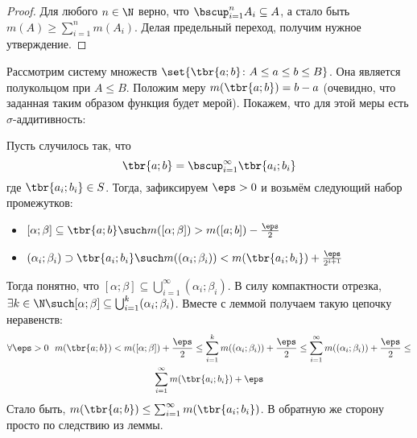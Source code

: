 \begin{proof}
	Для любого $n \in \N$ верно, что $\bscup_{i = 1}^n A_i \subseteq A$, а стало быть $m(A) \ge \sum_{i = 1}^n m(A_i)$. Делая предельный переход, получим нужное утверждение.
\end{proof}

\begin{example}
	Рассмотрим систему множеств $\set{\tbr{a; b} \colon A \le a \le b \le B}$. Она является полукольцом при $A \le B$. Положим меру $m(\tbr{a; b}) = b - a$ (очевидно, что заданная таким образом функция будет мерой). Покажем, что для этой меры есть $\sigma$-аддитивность:
	
	Пусть случилось так, что
	\[
		\tbr{a; b} = \bscup_{i = 1}^\infty \tbr{a_i; b_i}
	\]
	где $\tbr{a_i; b_i} \in S$. Тогда, зафиксируем $\eps > 0$ и возьмём следующий набор промежутков:
	\begin{itemize}
		\item $[\alpha; \beta] \subseteq \tbr{a; b} \such m([\alpha; \beta]) > m([a; b]) - \frac{\eps}{2}$
		
		\item $(\alpha_i; \beta_i) \supset \tbr{a_i; b_i} \such m((\alpha_i; \beta_i)) < m(\tbr{a_i; b_i}) + \frac{\eps}{2^{i + 1}}$
	\end{itemize}
	Тогда понятно, что $[\alpha; \beta] \subseteq \bigcup_{i = 1}^\infty (\alpha_i; \beta_i)$. В силу компактности отрезка, $\exists k \in \N \such [\alpha; \beta] \subseteq \bigcup_{i = 1}^k (\alpha_i; \beta_i)$. Вместе с леммой получаем такую цепочку неравенств:
	\begin{multline*}
		\forall \eps > 0\ \ m(\tbr{a; b}) < m([\alpha; \beta]) + \frac{\eps}{2} \le \sum_{i = 1}^k m((\alpha_i; \beta_i)) + \frac{\eps}{2} \le \sum_{i = 1}^\infty m((\alpha_i; \beta_i)) + \frac{\eps}{2} \le
		\\
		\sum_{i = 1}^\infty m(\tbr{a_i; b_i}) + \eps
	\end{multline*}
	Стало быть, $m(\tbr{a; b}) \le \sum_{i = 1}^\infty m(\tbr{a_i; b_i})$. В обратную же сторону просто по следствию из леммы.
\end{example}